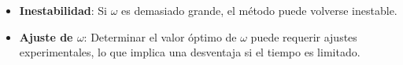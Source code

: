 \begin{itemize}
    \item \textbf{Inestabilidad}: Si \( \omega \) es demasiado grande, el método puede volverse inestable.
    \item \textbf{Ajuste de \( \omega \)}: Determinar el valor óptimo de \( \omega \) puede requerir ajustes experimentales, lo que implica una desventaja si el tiempo es limitado.
\end{itemize}










